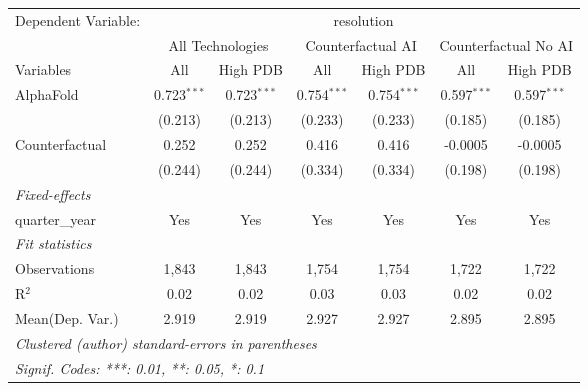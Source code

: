 \begingroup
\centering
\begin{tabular}{lcccccc}
   \tabularnewline \midrule \midrule
   Dependent Variable: & \multicolumn{6}{c}{resolution}\\
 & \multicolumn{2}{c}{All Technologies} & \multicolumn{2}{c}{Counterfactual AI} & \multicolumn{2}{c}{Counterfactual No AI} \\
\cmidrule(lr){1-1}\cmidrule(lr){2-3} \cmidrule(lr){4-5} \cmidrule(lr){6-7}
Variables & \multicolumn{1}{c}{All} & \multicolumn{1}{c}{High PDB} & \multicolumn{1}{c}{All} & \multicolumn{1}{c}{High PDB} & \multicolumn{1}{c}{All} & \multicolumn{1}{c}{High PDB} \\
\cmidrule(lr){1-1}\cmidrule(lr){2-2} \cmidrule(lr){3-3} \cmidrule(lr){4-4} \cmidrule(lr){5-5} \cmidrule(lr){6-6} \cmidrule(lr){7-7}
   AlphaFold      & 0.723$^{***}$ & 0.723$^{***}$ & 0.754$^{***}$ & 0.754$^{***}$ & 0.597$^{***}$ & 0.597$^{***}$\\   
                  & (0.213)       & (0.213)       & (0.233)       & (0.233)       & (0.185)       & (0.185)\\   
   Counterfactual & 0.252         & 0.252         & 0.416         & 0.416         & -0.0005       & -0.0005\\   
                  & (0.244)       & (0.244)       & (0.334)       & (0.334)       & (0.198)       & (0.198)\\   
   \midrule
   \emph{Fixed-effects}\\
   quarter\_year  & Yes           & Yes           & Yes           & Yes           & Yes           & Yes\\  
   \midrule
   \emph{Fit statistics}\\
   Observations   & 1,843         & 1,843         & 1,754         & 1,754         & 1,722         & 1,722\\  
   R$^2$          & 0.02          & 0.02          & 0.03          & 0.03          & 0.02          & 0.02\\  
Mean(Dep. Var.) & 2.919 & 2.919 & 2.927 & 2.927 & 2.895 & 2.895 \\
   \midrule \midrule
   \multicolumn{7}{l}{\emph{Clustered (author) standard-errors in parentheses}}\\
   \multicolumn{7}{l}{\emph{Signif. Codes: ***: 0.01, **: 0.05, *: 0.1}}\\
\end{tabular}
\par\endgroup
